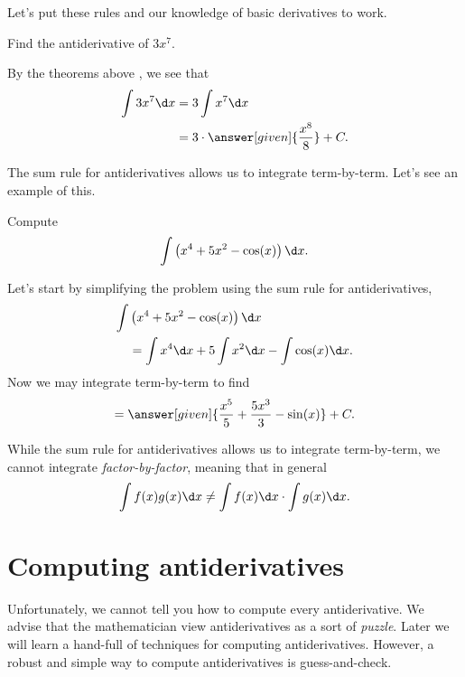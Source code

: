 \documentclass{ximera}
\begin{document}
Let's put these rules and our knowledge of basic derivatives to work.

\begin{example}
Find the antiderivative of $3 x^7$.
\begin{explanation}
By the theorems above , we see that
\begin{align*}
\int 3 x^7 \d x &= 3 \int x^7 \d x\\
&= 3 \cdot \answer[given]{\frac{x^8}{8}}+C.
\end{align*}
\end{explanation}
\end{example}

The sum rule for antiderivatives allows us to integrate
term-by-term. Let's see an example of this.

\begin{example}
Compute
\[
\int \left(x^4 + 5x^2 - \cos(x)\right) \d x.
\]
\begin{explanation}
Let's start by simplifying the problem using the sum rule for
antiderivatives, 
\begin{align*}
\int &\left(x^4 + 5x^2 - \cos(x)\right) \d x\\
&= \int x^4 \d x + 5\int x^2 \d x - \int \cos(x) \d x.
\end{align*}
Now we may integrate term-by-term to find
\[
= \answer[given]{\frac{x^5}{5} + \frac{5x^3}{3}  - \sin(x)}+C.
\]
\end{explanation}
\end{example}


\begin{warning}
While the sum rule for antiderivatives allows us to integrate
term-by-term, we cannot integrate \textit{factor-by-factor}, meaning
that in general
\[
\int f(x)g(x) \d x \ne \int f(x) \d x\cdot \int g(x) \d x.
\]
\end{warning}








\section{Computing antiderivatives}


Unfortunately, we cannot tell you how to compute every antiderivative.
We advise that the mathematician view antiderivatives as a sort of
\textit{puzzle}. Later we will learn a hand-full of techniques for
computing antiderivatives. However, a robust and simple way to compute
antiderivatives is guess-and-check.
\end{document}
